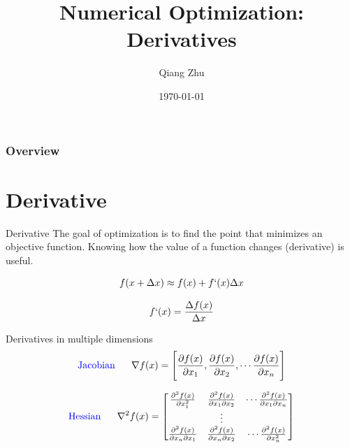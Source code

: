 \documentclass{beamer}
\title[Optimization]{Numerical Optimization: Derivatives} %
\author{Qiang Zhu} %
\institute[University of Nevada Las Vegas] %
{
University of Nevada Las Vegas\\ %
\medskip
}
\date{\today} %
\begin{document}
\begin{frame}
\titlepage %
\end{frame}

\begin{frame}
\frametitle{Overview} %
\tableofcontents %
\end{frame}



\section{Derivative}
\begin{frame}{Derivative}
The goal of optimization is to find the point that minimizes an objective function. Knowing how the value of a function changes (derivative) is useful.

 \begin{equation*}
     f(x + \Delta x) \approx f(x) + f`(x)\Delta x
 \end{equation*}
 
\begin{equation*}
    f`(x) = \frac{\Delta f(x)}{\Delta x}
\end{equation*}

Derivatives in multiple dimensions
\begin{equation*}
\textrm{\textcolor{blue}{Jacobian}}~~~~~     \nabla f(x) = \Bigg[\frac{\partial f(x)}{\partial x_1}, \frac{\partial f(x)}{\partial x_2},  \cdots \frac{\partial f(x)}{\partial x_n} \Bigg]
\end{equation*}

\begin{equation*}
\textrm{\textcolor{blue}{Hessian}}~~~~~    \nabla^2 f(x) = 
    \begin{bmatrix}
\frac{\partial^2 f(x)}{\partial x_1^2 } & \frac{\partial^2 f(x)}{\partial x_1 \partial x_2 } & \cdots \frac{\partial^2 f(x)}{\partial x_1 \partial x_n }\\
 & \vdots & \\
\frac{\partial^2 f(x)}{\partial x_n \partial x_1} & \frac{\partial^2 f(x)}{\partial x_n \partial x_2 } & \cdots \frac{\partial^2 f(x)}{\partial x_n^2 } \\
\end{bmatrix}
\end{equation*}
\end{frame}
\end{document}

